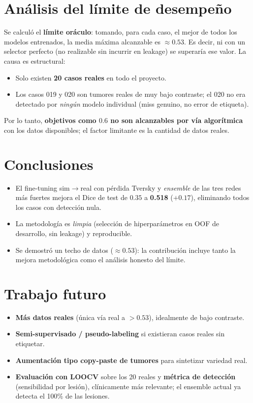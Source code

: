 \documentclass[11pt]{article}
\newcommand{\best}[1]{\textbf{#1}}
\begin{document}
\section{Análisis del límite de desempeño}
Se calculó el \textbf{límite oráculo}: tomando, para cada caso, el mejor de todos los
modelos entrenados, la media máxima alcanzable es $\approx 0.53$. Es decir, ni con un
selector perfecto (no realizable sin incurrir en leakage) se superaría ese valor.
La causa es estructural:
\begin{itemize}\itemsep2pt
  \item Solo existen \textbf{20 casos reales} en todo el proyecto.
  \item Los casos 019 y 020 son tumores reales de muy bajo contraste; el 020 no era
        detectado por \emph{ningún} modelo individual (miss genuino, no error de etiqueta).
\end{itemize}
Por lo tanto, \textbf{objetivos como $0.6$ no son alcanzables por vía algorítmica}
con los datos disponibles; el factor limitante es la cantidad de datos reales.

\section{Conclusiones}
\begin{itemize}\itemsep2pt
  \item El fine-tuning sim$\rightarrow$real con pérdida Tversky y \emph{ensemble} de las
        tres redes más fuertes mejora el Dice de test de $0.35$ a \best{0.518}
        ($+0.17$), eliminando todos los casos con detección nula.
  \item La metodología es \emph{limpia} (selección de hiperparámetros en OOF de
        desarrollo, sin leakage) y reproducible.
  \item Se demostró un techo de datos ($\approx 0.53$): la contribución incluye tanto
        la mejora metodológica como el análisis honesto del límite.
\end{itemize}

\section{Trabajo futuro}
\begin{itemize}\itemsep2pt
  \item \textbf{Más datos reales} (única vía real a $>0.53$), idealmente de bajo contraste.
  \item \textbf{Semi-supervisado / pseudo-labeling} si existieran casos reales sin etiquetar.
  \item \textbf{Aumentación tipo copy-paste de tumores} para sintetizar variedad real.
  \item \textbf{Evaluación con LOOCV} sobre los 20 reales y \textbf{métrica de detección}
        (sensibilidad por lesión), clínicamente más relevante; el ensemble actual ya
        detecta el 100\% de las lesiones.
\end{itemize}
\end{document}
